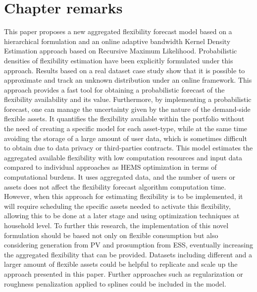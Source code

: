 \section{Chapter remarks} \label{Sect:Conclusions}
This paper proposes a new aggregated flexibility forecast model based on a hierarchical formulation and an online adaptive bandwidth Kernel Density Estimation approach based on Recursive Maximum Likelihood. Probabilistic densities of flexibility estimation have been explicitly formulated under this approach. Results based on a real dataset case study show that it is possible to approximate and track an unknown distribution under an online framework. This approach provides a fast tool for obtaining a probabilistic forecast of the flexibility availability and its value. Furthermore, by implementing a probabilistic forecast, one can manage the uncertainty given by the nature of the demand-side flexible assets. 
It quantifies the flexibility available within the portfolio without the need of creating a specific model for each asset-type, while at the same time avoiding the storage of a large amount of user data, which is sometimes difficult to obtain due to data privacy or third-parties contracts. 
This model estimates the aggregated available flexibility with low computation resources and input data compared to individual approaches as HEMS optimization in terms of computational burdens. It uses aggregated data, and the number of users or assets does not affect the flexibility forecast algorithm computation time. However, when this approach for estimating flexibility is to be implemented, it will require scheduling the specific assets needed to activate this flexibility, allowing this to be done at a later stage and using optimization techniques at household level. To further this research, the implementation of this novel formulation should be based not only on flexible consumption but also considering generation from PV and prosumption from ESS, eventually increasing the aggregated flexibility that can be provided. Datasets including different and a larger amount of flexible assets could be helpful to replicate and scale up the approach presented in this paper. Further approaches such as regularization or roughness penalization applied to splines could be included in the model.

